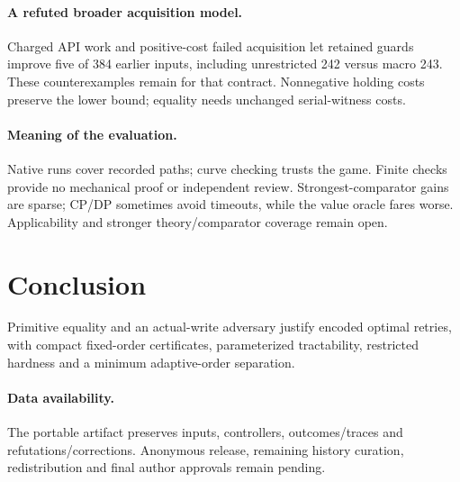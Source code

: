 \documentclass[acmsmall,screen,review,anonymous]{acmart}
\begin{document}
\paragraph{A refuted broader acquisition model.}
Charged API work and positive-cost failed acquisition let retained guards improve five of 384 earlier inputs, including unrestricted 242 versus macro 243. These counterexamples remain for that contract. Nonnegative holding costs preserve the lower bound; equality needs unchanged serial-witness costs.

\paragraph{Meaning of the evaluation.}
Native runs cover recorded paths; curve checking trusts the game. Finite checks provide no mechanical proof or independent review. Strongest-comparator gains are sparse; CP/DP sometimes avoid timeouts, while the value oracle fares worse. Applicability and stronger theory/comparator coverage remain open.

\section{Conclusion}
\label{sec:conclusion}

Primitive equality and an actual-write adversary justify encoded optimal retries, with compact fixed-order certificates, parameterized tractability, restricted hardness and a minimum adaptive-order separation.

\paragraph{Data availability.}
The portable artifact preserves inputs, controllers, outcomes/traces and refutations/corrections. Anonymous release, remaining history curation, redistribution and final author approvals remain pending.
\end{document}
